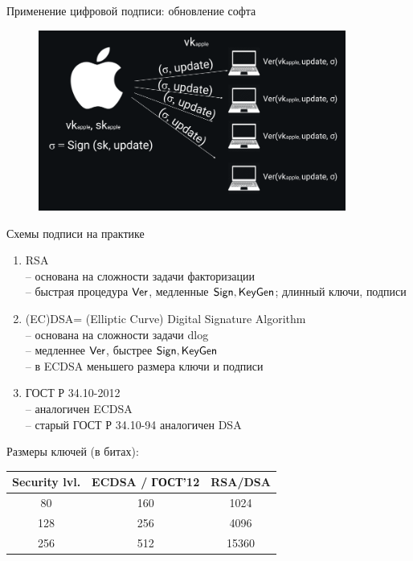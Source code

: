 \documentclass[usenames,dvipsnames,8pt,aspectratio=169]{beamer}
\begin{document}
\begin{frame}{Применение цифровой подписи: обновление софта}

\begin{figure}
	\hspace{-60pt}
	\includegraphics[width=0.9\textwidth]{Signature_software}
\end{figure}
\end{frame}

\begin{frame}{Схемы подписи на практике}
\Large
\begin{enumerate}
	\itemsep10pt
	\item {\color{Orange} RSA} \\
	-- основана на сложности задачи {\color{Orange} факторизации}\\
	-- быстрая процедура $\textsf{Ver}$, медленные $\textsf{Sign}, \textsf{KeyGen}$; длинный ключи, подписи
	
	\item {\color{Orange} (EC)DSA= (Elliptic Curve) Digital Signature Algorithm} \\
	-- основана на сложности задачи  {\color{Orange} dlog}\\
	-- медленнее $\textsf{Ver}$, быстрее $\textsf{Sign}, \textsf{KeyGen}$\\
	-- в ECDSA меньшего размера ключи и подписи
	\pause
	\item {\color{Orange} ГОСТ Р 34.10-2012 }  \\
	-- аналогичен ECDSA \\
	-- старый ГОСТ Р 34.10-94 аналогичен DSA
\end{enumerate}
\pause
\centering

Размеры ключей (в битах):\\[5pt]
\begin{tabular}{c | c| c}
	Security lvl. & ECDSA / ГОСТ'12 & RSA/DSA \\ \hline
	80 & 160 & 1024 \\
	128 & 256 & 4096 \\
	256 & 512 & 15360
\end{tabular}
\end{frame}
\end{document}
